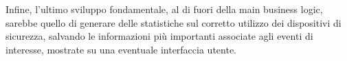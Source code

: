 Infine, l'ultimo sviluppo fondamentale, al di fuori della main business logic, sarebbe quello di generare delle statistiche sul corretto utilizzo dei dispositivi di sicurezza, salvando le informazioni più importanti associate agli eventi di interesse, mostrate su una eventuale interfaccia utente.